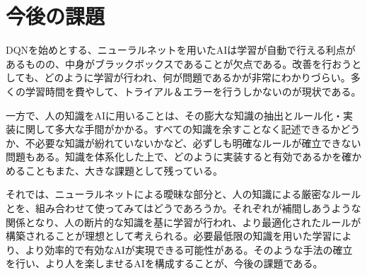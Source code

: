 \documentclass[12pt]{jarticle}
\begin{document}
\section{今後の課題}
DQNを始めとする、ニューラルネットを用いたAIは学習が自動で行える利点があるものの、中身がブラックボックスであることが欠点である。改善を行おうとしても、どのように学習が行われ、何が問題であるかが非常にわかりづらい。多くの学習時間を費やして、トライアル＆エラーを行うしかないのが現状である。

一方で、人の知識をAIに用いることは、その膨大な知識の抽出とルール化・実装に関して多大な手間がかかる。すべての知識を余すことなく記述できるかどうか、不必要な知識が紛れていないかなど、必ずしも明確なルールが確立できない問題もある。知識を体系化した上で、どのように実装すると有効であるかを確かめることもまた、大きな課題として残っている。

それでは、ニューラルネットによる曖昧な部分と、人の知識による厳密なルールとを、組み合わせて使ってみてはどうであろうか。それぞれが補間しあうような関係となり、人の断片的な知識を基に学習が行われ、より最適化されたルールが構築されることが理想として考えられる。必要最低限の知識を用いた学習により、より効率的で有効なAIが実現できる可能性がある。そのような手法の確立を行い、より人を楽しませるAIを構成することが、今後の課題である。

\newpage


\end{document}
